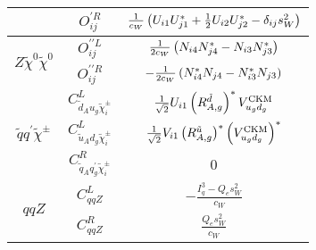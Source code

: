\documentclass[../main.tex]{subfiles}
\begin{document}
{\begin{table}[ht!]
\begin{tabular}{|c|c|c|}
                                                           & \(O_{ij}^{\prime R}\)                               & \(\frac{1}{c_W} \left(U_{i1}U_{j1}^\ast + \frac{1}{2} U_{i2}U_{j2}^\ast - \delta_{ij} s_W^2\right)\)                                                                                          \\
    \hline
    \multirow{2}{*}{\(Z \tilde\chi^0 \tilde\chi^0\)}       & \(O^{\prime\prime L}_{ij}\)                         & \(\frac{1}{2c_W} \left(N_{i4} N_{j4}^\ast - N_{i3} N_{j3}^\ast\right)\)                                                                                                                       \\
                                                           & \(O^{\prime\prime R}_{ij}\)                         & \(-\frac{1}{2c_W} \left(N_{i4}^\ast N_{j4} - N_{i3}^\ast N_{j3}\right)\)                                                                                                                      \\
    \hline
    \multirow{3}{*}{\(\tilde{q} q^\prime \tilde\chi^\pm\)} & \(C_{\tilde{d}_A u_g \tilde{\chi}^\pm_i}^L\)        & \(\frac{1}{\sqrt{2}} U_{i1} \left(R^{\tilde{d}}_{A,g}\right)^\ast V_{u_g d_g}^\text{CKM}\)                                                                                                    \\
                                                           & \(C_{\tilde{u}_A d_g \tilde{\chi}^\pm_i}^L\)        & \(\frac{1}{\sqrt{2}} V_{i1} \left(R^{\tilde{u}}_{A,g}\right)^\ast \left(V_{u_g d_g}^\text{CKM}\right)^\ast\)                                                                                     \\
                                                           & \(C_{\tilde{q}_A q^\prime_g \tilde{\chi}^\pm_i}^R\) & 0                                                                                                                                                                                          \\
    \hline
    \multirow{2}{*}{\(q q Z\)}                             & \(C_{qqZ}^L\)                                       & \(-\frac{I^3_q - Q_e s_W^2}{c_W}\)                                                                                                                                                         \\
                                                           & \(C_{qqZ}^R\)                                       & \(\frac{Q_e s_W^2}{c_W}\)                                                                                                                                                                  \\

\end{tabular}
\end{table}}
\end{document}
